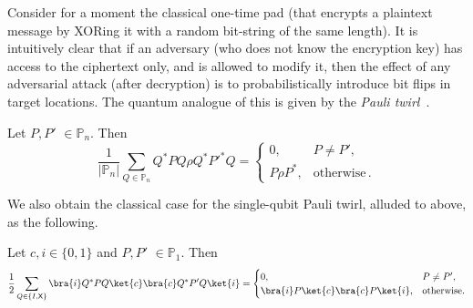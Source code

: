 \documentclass{toc}
\newcommand{\xgate}{{\sf X}}
\providecommand{\abs}[1]{\lvert#1\rvert}
\begin{document}
Consider for a moment the classical one-time pad (that encrypts a plaintext message by XORing it with a random bit-string of the same length). It is intuitively clear that if an adversary (who does not know the encryption key) has access to the ciphertext only, and is allowed to modify it, then the effect of any adversarial attack (after decryption) is to probabilistically introduce bit flips in target locations. The quantum analogue of this is given by the \emph{Pauli twirl}~\cite{DCEL09}.  %


\begin{lemma}\label{lem:Pauli-twirl}
Let $P, P'$  $\in \mathbb{P}_n$. Then %
\begin{equation}
\frac{1}{\abs{\mathbb{P}_n}} \sum_{Q \in \mathbb{P}_n} Q^* P Q \rho Q^* P'^* Q = \begin{cases} 0,& P \neq P', \\ P\rho P^* ,& \text{otherwise}\,.\end{cases}
\end{equation}
\end{lemma}

We also obtain the classical case for the single-qubit  Pauli twirl,
alluded to above, as the following. %

\begin{lemma}\label{lem:classical-Pauli-twirl-X} Let $c,i \in \{0,1\}$ and $P, P'$  $\in \mathbb{P}_1$.
Then %
\begin{equation}\frac{1}{2} \sum_{Q \in \{I, \xgate\}} \bra{i}  Q^* P Q \ket{c}\bra{c} Q^* P' Q \ket{i} =
 \begin{cases}
 0, & P \neq P',\\
\bra{i}   P  \ket{c}\bra{c}  P \ket{i},& \text{otherwise}.
  \end{cases}
    \end{equation}
\end{lemma}
\end{document}
